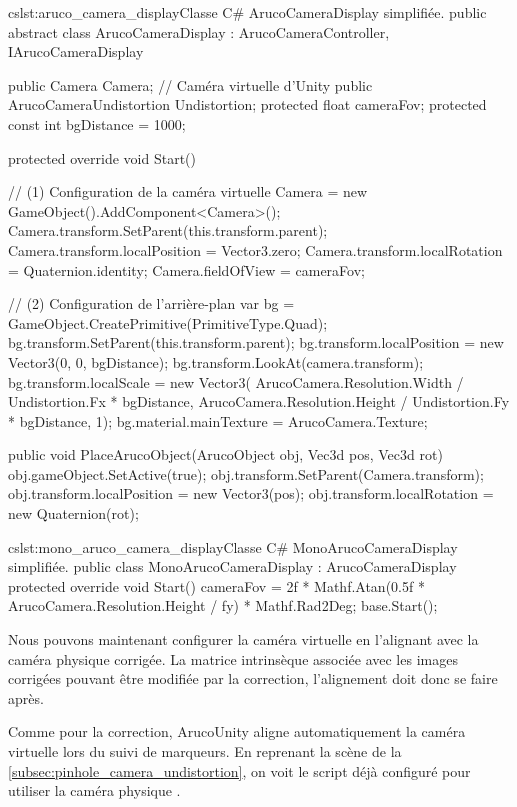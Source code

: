 \begin{listingETS}{cs}{lst:aruco_camera_display}{Classe C\# ArucoCameraDisplay simplifiée.}
  public abstract class ArucoCameraDisplay : ArucoCameraController, IArucoCameraDisplay
  {
    public Camera Camera; // Caméra virtuelle d'Unity
    public ArucoCameraUndistortion Undistortion;
    protected float cameraFov;
    protected const int bgDistance = 1000;

    protected override void Start()
    {
      // (1) Configuration de la caméra virtuelle
      Camera = new GameObject().AddComponent<Camera>();
      Camera.transform.SetParent(this.transform.parent);
      Camera.transform.localPosition = Vector3.zero;
      Camera.transform.localRotation = Quaternion.identity;
      Camera.fieldOfView = cameraFov;

      // (2) Configuration de l'arrière-plan
      var bg = GameObject.CreatePrimitive(PrimitiveType.Quad);
      bg.transform.SetParent(this.transform.parent);
      bg.transform.localPosition = new Vector3(0, 0, bgDistance);
      bg.transform.LookAt(camera.transform);
      bg.transform.localScale = new Vector3(
        ArucoCamera.Resolution.Width / Undistortion.Fx * bgDistance,
        ArucoCamera.Resolution.Height / Undistortion.Fy * bgDistance, 1);
      bg.material.mainTexture = ArucoCamera.Texture;
    }

    public void PlaceArucoObject(ArucoObject obj, Vec3d pos, Vec3d rot)
    {
      obj.gameObject.SetActive(true);
      obj.transform.SetParent(Camera.transform);
      obj.transform.localPosition = new Vector3(pos);
      obj.transform.localRotation = new Quaternion(rot);
    }
  }
\end{listingETS}

\begin{listingETS}{cs}{lst:mono_aruco_camera_display}{Classe C\# MonoArucoCameraDisplay simplifiée.}
  public class MonoArucoCameraDisplay : ArucoCameraDisplay
  {
    protected override void Start()
    {
      cameraFov = 2f * Mathf.Atan(0.5f * ArucoCamera.Resolution.Height / fy) * Mathf.Rad2Deg;
      base.Start();
    }
  }
\end{listingETS}

Nous pouvons maintenant configurer la caméra virtuelle en l'alignant avec la caméra physique corrigée. La matrice intrinsèque associée avec les images corrigées pouvant être modifiée par la correction, l'alignement doit donc se faire après.

Comme pour la correction, ArucoUnity aligne automatiquement la caméra virtuelle lors du suivi de marqueurs. En reprenant la scène de la \autoref{subsec:pinhole_camera_undistortion}, on voit le script déjà configuré pour utiliser la caméra physique .


